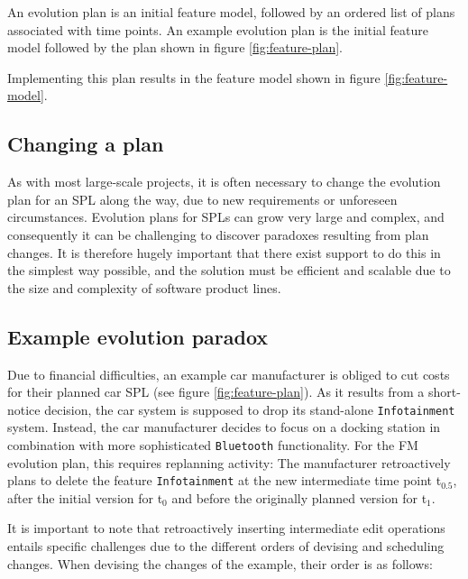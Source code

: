\documentclass[a4paper,english]{ifimaster}
\newcommand{\timepoint}[1]{t$_#1$}
\begin{document}
An evolution plan is an initial feature model, followed by an ordered list of plans associated with time points. An example evolution plan is the initial feature model followed by the plan shown in figure \vref{fig:feature-plan}.

Implementing this plan results in the feature model shown in figure \vref{fig:feature-model}.

\subsection{Changing a plan}
\label{sub:changing-a-plan}
As with most large-scale projects, it is often necessary to change the evolution plan for an SPL along the way, due to new requirements or unforeseen circumstances.
Evolution plans for SPLs can grow very large and complex, and consequently it can be challenging to discover paradoxes resulting from plan changes.
It is therefore hugely important that there exist support to do this in the simplest way possible, and the solution must be efficient and scalable due to the size and complexity of software product lines.

\newpage
\subsection{Example evolution paradox}
\label{sub:example-evolution-paradox}
Due to financial difficulties, an example car manufacturer is obliged to cut costs for their planned car SPL (see figure \vref{fig:feature-plan}).
As it results from a short-notice decision, the car system is supposed to drop its stand-alone \texttt{Infotainment} system.
Instead, the car manufacturer decides to focus on a docking station in combination with more sophisticated \texttt{Bluetooth} functionality.
For the FM evolution plan, this requires replanning activity:
The manufacturer retroactively plans to delete the feature \texttt{Infotainment} at the new intermediate time point \timepoint{0.5}, after the initial version for \timepoint{0} and before the originally planned version for \timepoint{1}.%


It is important to note that retroactively inserting intermediate edit operations entails specific challenges due to the different orders of devising and scheduling changes. When devising the changes of the example, their order is as follows:
\end{document}
